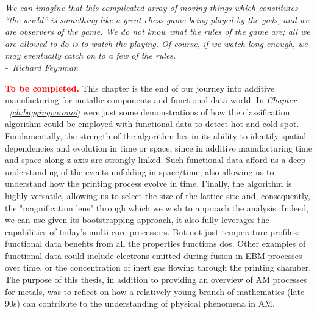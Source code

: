 \begin{minipage}{0.6\textwidth}
\small
			\textit{We can imagine that this complicated array of moving things which constitutes “the world” is something like a great chess game being played by the gods, and we are observers of the game. We do not know what the rules of the game are; all we are allowed to do is to watch the playing. Of course, if we watch long enough, we may eventually catch on to a few of the rules.
            \\[1.5ex]-~Richard Feynman}
   \\[1ex]
   \end{minipage}

\textcolor{red}{\textbf{To be completed.}}
This chapter is the end of our journey into additive manufacturing for metallic components and functional data world. In \emph{Chapter ~\ref{ch:baggingvoronoi}} were just some demonstrations of how the classification algorithm could be employed with functional data to detect hot and cold spot. Fundamentally, the strength of the algorithm lies in its ability to identify spatial dependencies and evolution in time or space, since in additive manufacturing time and space along z-axis are strongly linked. Such functional data afford us a deep understanding of the events unfolding in space/time, also allowing us to understand how the printing process evolve in time. Finally, the algorithm is highly versatile, allowing us to select the size of the lattice site and, consequently, the "magnification lens" through which we wish to approach the analysis. Indeed, we can use given its bootstrapping approach, it also fully leverages the capabilities of today's multi-core processors. But not just temperature profiles: functional data benefits from all the properties functions dos. Other examples of functional data could include electrons emitted during fusion in EBM processes over time, or the concentration of inert gas flowing through the printing chamber.
The purpose of this thesis, in addition to providing an overview of AM processes for metals, was to reflect on how a relatively young branch of mathematics (late 90s) can contribute to the understanding of physical phenomena in AM.